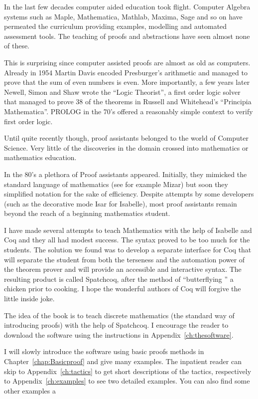 In the last few decades computer aided education took flight. Computer Algebra systems such as Maple, Mathematica, Mathlab, Maxima, Sage and so on have permeated the curriculum providing examples, modelling and  automated assessment tools. The teaching of proofs and abstractions have seen almost none of these.

This is surprising since computer assisted proofs are almost as old as computers. Already in 1954  Martin Davis encoded Presburger's arithmetic and managed to prove that the sum of even numbers is even. More importantly, a few years later  Newell, Simon and  Shaw wrote  the ``Logic Theorist'', a first order logic solver that managed to prove 38 of the theorems in Russell and Whitehead's  ``Principia Mathematica''. PROLOG in the 70's offered a reasonably simple context to verify first order logic.

Until quite recently though, proof assistants belonged to the world of Computer Science. Very little of the discoveries in the domain crossed  into mathematics or mathematics education.

In the 80's a plethora of Proof assistants appeared. Initially, they mimicked the standard language of mathematics (see for example Mizar) but soon they simplified notation for the sake of efficiency. Despite attempts by some developers (such as the decorative mode Isar for Isabelle), most proof assistants remain beyond the reach of a beginning mathematics student.

I have made several attempts to teach Mathematics with the help of Isabelle and Coq and they all had  modest success. The syntax proved to be too much for the students. The solution we found was to develop a separate interface for Coq that will separate the student from both the terseness and the automation power of the theorem prover and will provide an accessible and interactive syntax. The resulting product is called Spatchcoq, after the method of ``butterflying '' a chicken prior to cooking. I hope  the wonderful authors of Coq will forgive the little inside joke.

The idea of the book is to teach discrete mathematics (the standard way of introducing proofs) with the help of Spatchcoq. I encourage the reader  to download the software using the instructions in Appendix~\ref{ch:thesoftware}. 


I will slowly introduce the software using basic proofs methods in Chapter~\ref{chap:Basicproof}  and give many examples. The inpatient reader can skip to Appendix~\ref{ch:tactics} to get short descriptions of the tactics, respectively to Appendix~\ref{ch:examples} to see two detailed examples. You can also find some other examples  a
 
